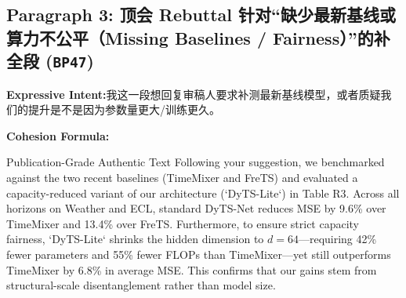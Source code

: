 \subsection*{Paragraph 3: 顶会 Rebuttal 针对“缺少最新基线或算力不公平（Missing Baselines / Fairness）”的补全段 (\texttt{BP47})}
\noindent\textbf{Expressive Intent:}\enspace 我这一段想回复审稿人要求补测最新基线模型，或者质疑我们的提升是不是因为参数量更大/训练更久。\par
\noindent\textbf{Cohesion Formula:}\par\vspace{4pt}
\begin{ExampleBox}{Publication-Grade Authentic Text}
Following your suggestion, we benchmarked against the two recent baselines (TimeMixer and FreTS) and evaluated a capacity-reduced variant of our architecture (`DyTS-Lite`) in Table R3. Across all horizons on Weather and ECL, standard DyTS-Net reduces MSE by 9.6\% over TimeMixer and 13.4\% over FreTS. Furthermore, to ensure strict capacity fairness, `DyTS-Lite` shrinks the hidden dimension to $d=64$---requiring 42\% fewer parameters and 55\% fewer FLOPs than TimeMixer---yet still outperforms TimeMixer by 6.8\% in average MSE. This confirms that our gains stem from structural-scale disentanglement rather than model size.
\end{ExampleBox}
